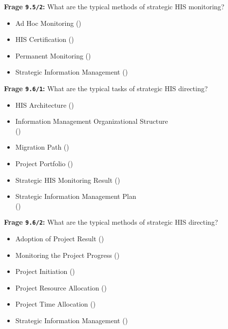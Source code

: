 \textbf{Frage \texttt{9.5/2}:} What are the typical methods of strategic HIS monitoring?

\begin{itemize}
  \item Ad Hoc Monitoring ()
  \item HIS Certification ()
  \item Permanent Monitoring ()
  \item Strategic Information Management ()
\end{itemize}

\textbf{Frage \texttt{9.6/1}:} What are the typical tasks of strategic HIS directing?

\begin{itemize}
  \item HIS Architecture ()
  \item Information Management Organizational Structure \\
  ()
  \item Migration Path ()
  \item Project Portfolio ()
  \item Strategic HIS Monitoring Result ()
  \item Strategic Information Management Plan \\
  ()
\end{itemize}

\textbf{Frage \texttt{9.6/2}:} What are the typical methods of strategic HIS directing?

\begin{itemize}
  \item Adoption of Project Result ()
  \item Monitoring the Project Progress ()
  \item Project Initiation ()
  \item Project Resource Allocation ()
  \item Project Time Allocation ()
  \item Strategic Information Management ()
\end{itemize}


